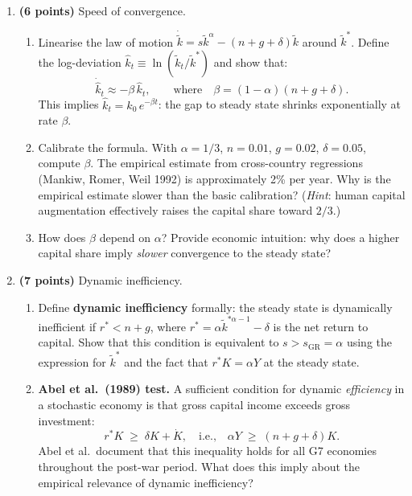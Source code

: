\documentclass[a4paper,11pt]{article}
\newcommand{\ktilde}{\tilde{k}}
\begin{document}
\begin{enumerate}[label=\textbf{\arabic*.}, leftmargin=*, itemsep=6pt]
    \item \textbf{(6 points)} Speed of convergence.

    \begin{enumerate}[label=(\alph*), itemsep=4pt]
        \item Linearise the law of motion $\dot{\ktilde} = s\ktilde^{\alpha}
        - (n+g+\delta)\ktilde$ around $\ktilde^*$.  Define the log-deviation
        $\hat{k}_t \equiv \ln(\ktilde_t/\ktilde^*)$ and show that:
        \[
            \dot{\hat{k}}_t \approx -\beta\,\hat{k}_t,
            \qquad \text{where} \quad
            \beta = (1-\alpha)(n+g+\delta).
        \]
        This implies $\hat{k}_t = \hat{k}_0\,e^{-\beta t}$: the gap to steady state
        shrinks exponentially at rate $\beta$.

        \item Calibrate the formula.  With $\alpha = 1/3$, $n = 0.01$, $g = 0.02$,
        $\delta = 0.05$, compute $\beta$.  The empirical estimate from cross-country
        regressions (Mankiw, Romer, Weil 1992) is approximately 2\% per year.
        Why is the empirical estimate slower than the basic calibration?
        (\textit{Hint}: human capital augmentation effectively raises the capital share
        toward $2/3$.)

        \item How does $\beta$ depend on $\alpha$?  Provide economic intuition: why does
        a higher capital share imply \emph{slower} convergence to the steady state?
    \end{enumerate}

    \item \textbf{(7 points)} Dynamic inefficiency.

    \begin{enumerate}[label=(\alph*), itemsep=4pt]
        \item Define \textbf{dynamic inefficiency} formally: the steady state is
        dynamically inefficient if $r^* < n + g$, where $r^* = \alpha\ktilde^{*\alpha-1}
        - \delta$ is the net return to capital.  Show that this condition is equivalent
        to $s > s_{\mathrm{GR}} = \alpha$ using the expression for $\ktilde^*$ and the
        fact that $r^* K = \alpha Y$ at the steady state.

        \item \textbf{Abel et al.\ (1989) test.}  A sufficient condition for dynamic
        \emph{efficiency} in a stochastic economy is that gross capital income exceeds
        gross investment:
        \[
            r^* K \;\geq\; \delta K + \dot{K},
            \quad\text{i.e.,}\quad
            \alpha Y \;\geq\; (n+g+\delta)K.
        \]
        Abel et al.\ document that this inequality holds for all G7 economies throughout
        the post-war period.  What does this imply about the empirical relevance of
        dynamic inefficiency?


\end{enumerate}
\end{enumerate}
\end{document}
